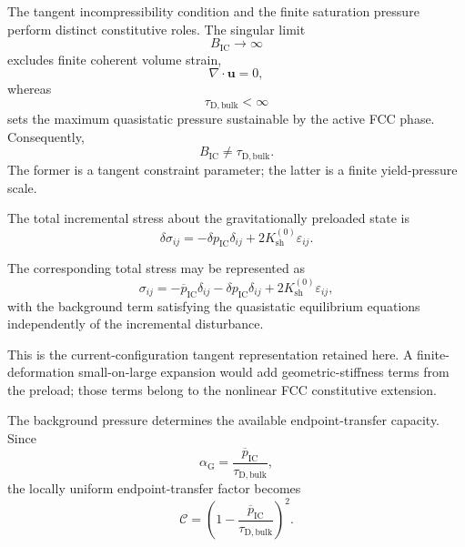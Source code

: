 The tangent incompressibility condition and the finite saturation pressure perform distinct constitutive roles. The singular limit
\begin{equation}
    B_{\mathrm{IC}}\rightarrow\infty
\end{equation}
excludes finite coherent volume strain,
\begin{equation}
    \nabla\cdot\mathbf{u}=0,
\end{equation}
whereas
\begin{equation}
    \tau_{\mathrm{D,bulk}}<\infty
\end{equation}
sets the maximum quasistatic pressure sustainable by the active FCC phase. Consequently,
\begin{equation}
    \boxed{ B_{\mathrm{IC}} \neq \tau_{\mathrm{D,bulk}} }.
\end{equation}
The former is a tangent constraint parameter; the latter is a finite yield-pressure scale.

The total incremental stress about the gravitationally preloaded state is
\begin{equation}
    \delta\sigma_{ij} = -\delta p_{\mathrm{IC}}\delta_{ij} + 2K_{\mathrm{sh}}^{(0)} \varepsilon_{ij}.
\end{equation}

The corresponding total stress may be represented as
\begin{equation}
    \sigma_{ij} = -\overline{p}_{\mathrm{IC}}\delta_{ij} - \delta p_{\mathrm{IC}}\delta_{ij} + 2K_{\mathrm{sh}}^{(0)} \varepsilon_{ij},
\end{equation}
with the background term satisfying the quasistatic equilibrium equations independently of the incremental disturbance.

This is the current-configuration tangent representation retained here. A finite-deformation small-on-large expansion would add geometric-stiffness terms from the preload; those terms belong to the nonlinear FCC constitutive extension.

The background pressure determines the available endpoint-transfer capacity. Since
\begin{equation}
    \alpha_{\mathrm{G}} = \frac{\overline{p}_{\mathrm{IC}}}{\tau_{\mathrm{D,bulk}}},
\end{equation}
the locally uniform endpoint-transfer factor becomes
\begin{equation}
    \mathcal{C} = \left( 1- \frac{\overline{p}_{\mathrm{IC}}}{\tau_{\mathrm{D,bulk}}} \right)^2.
\end{equation}

